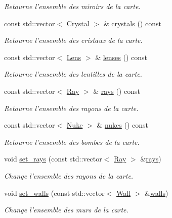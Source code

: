 \begin{DoxyCompactItemize}
\begin{DoxyCompactList}\small\item\em Retourne l'ensemble des miroirs de la carte. \end{DoxyCompactList}\item 
const std\+::vector$<$ \hyperlink{classCrystal}{Crystal} $>$ \& \hyperlink{classLevel_a5371b5d3d021f9b9cbb3ba4701746ae2}{crystals} () const 
\begin{DoxyCompactList}\small\item\em Retourne l'ensemble des cristaux de la carte. \end{DoxyCompactList}\item 
const std\+::vector$<$ \hyperlink{classLens}{Lens} $>$ \& \hyperlink{classLevel_aca6b1af0d4c00c50922bcc1af73f102b}{lenses} () const 
\begin{DoxyCompactList}\small\item\em Retourne l'ensemble des lentilles de la carte. \end{DoxyCompactList}\item 
const std\+::vector$<$ \hyperlink{classRay}{Ray} $>$ \& \hyperlink{classLevel_acf3ca670d2e2c3c0652dcc66f254cdb6}{rays} () const 
\begin{DoxyCompactList}\small\item\em Retourne l'ensemble des rayons de la carte. \end{DoxyCompactList}\item 
const std\+::vector$<$ \hyperlink{classNuke}{Nuke} $>$ \& \hyperlink{classLevel_acd20c7d517d45796dd33bf9846469cd5}{nukes} () const 
\begin{DoxyCompactList}\small\item\em Retourne l'ensemble des bombes de la carte. \end{DoxyCompactList}\item 
void \hyperlink{classLevel_a55b2185003fbd176c342f4ff014919d0}{set\+\_\+rays} (const std\+::vector$<$ \hyperlink{classRay}{Ray} $>$ \&\hyperlink{classLevel_acf3ca670d2e2c3c0652dcc66f254cdb6}{rays})
\begin{DoxyCompactList}\small\item\em Change l'ensemble des rayons de la carte. \end{DoxyCompactList}\item 
void \hyperlink{classLevel_a35671c58a119ab9c7e6fb4650b8e8fb9}{set\+\_\+walls} (const std\+::vector$<$ \hyperlink{classWall}{Wall} $>$ \&\hyperlink{classLevel_add82438c31441eaf067b3c4c290c34bc}{walls})
\begin{DoxyCompactList}\small\item\em Change l'ensemble des murs de la carte. \end{DoxyCompactList}\item 

\end{DoxyCompactItemize}
